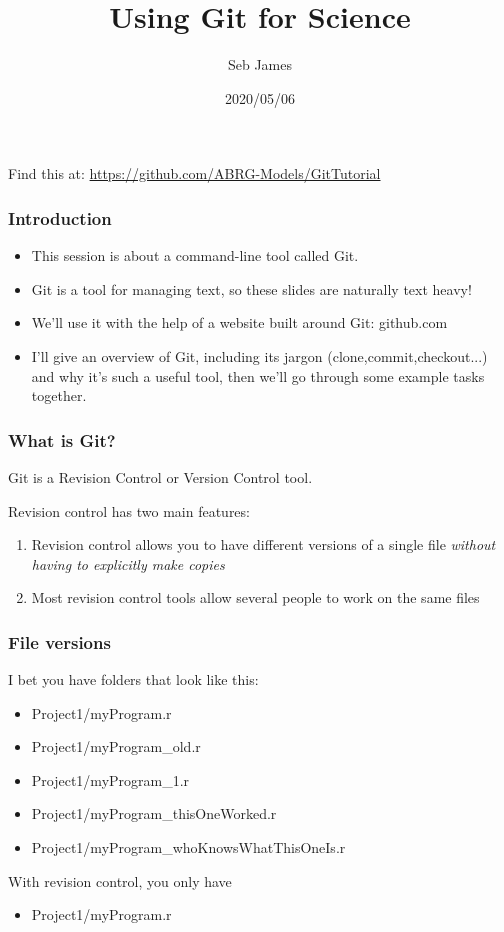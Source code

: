 \documentclass{beamer}
\title{Using Git for Science}
\author{Seb James}
\institute{PSY6422}
\date{2020/05/06}
\begin{document}
\begin{frame}
  \titlepage %
  Find this at: \url{https://github.com/ABRG-Models/GitTutorial}
\end{frame}

\begin{frame}
  \frametitle{Introduction}
  \begin{itemize}
    \item This session is about a command-line tool called Git.

    \item Git is a tool for managing text, so these slides are naturally text
      heavy!

    \item We'll use it with the help of a website built around Git: github.com

    \item I'll give an overview of Git, including its jargon
      (\alert{clone},\alert{commit},\alert{checkout}...) and why it's
      such a useful tool, then we'll go through some example tasks together.
  \end{itemize}
\end{frame}

\begin{frame}
  \frametitle{What is Git?}
  Git is a \alert{Revision Control} or \alert{Version Control} tool.

  Revision control has two main features:

  \begin{enumerate}
    \pause \item Revision control allows you to have different versions of a
      single file \emph{without having to explicitly make copies}
      \pause \item Most revision control tools allow several people to work
      on the same files %
  \end{enumerate}
\end{frame}

\begin{frame}
  \frametitle{File versions}
  I bet you have folders that look like this:
  \pause \begin{itemize}
  \item Project1/myProgram.r
    \pause \item Project1/myProgram\_old.r
  \item Project1/myProgram\_1.r
  \item Project1/myProgram\_thisOneWorked.r
  \item Project1/myProgram\_whoKnowsWhatThisOneIs.r
  \end{itemize}
  \pause With revision control, you only have
  \begin{itemize}
  \item Project1/myProgram.r
  \end{itemize}
\end{frame}
\end{document}
